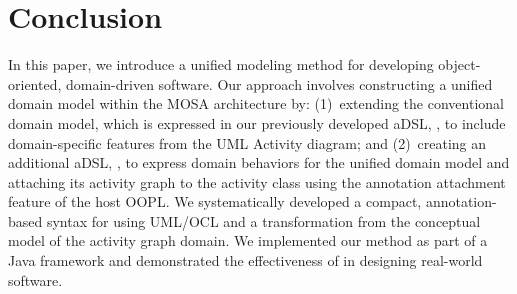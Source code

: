 %
\section{Conclusion}\label{sect:conclusion} %
%

In this paper, we introduce a uniﬁed modeling method for developing object-oriented, domain-driven software. Our approach involves constructing a uniﬁed domain model within the MOSA architecture by: (1)~extending the conventional domain model, which is expressed in our previously developed aDSL, \dcsl, to include domain-speciﬁc features from the UML Activity diagram; and
(2)~creating an additional aDSL, \agl, to express domain behaviors for the uniﬁed domain model and attaching its activity graph to the activity class using the annotation attachment feature of the host OOPL. We systematically developed a compact, annotation-based syntax for \agl using UML/OCL and a transformation from the conceptual model of the activity graph domain. We implemented our method as part of a Java framework and demonstrated the effectiveness of \agldcsl in designing real-world software.

